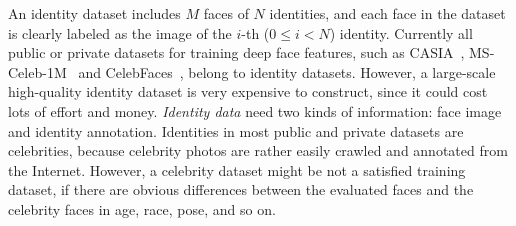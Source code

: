\documentclass[conference]{acmsiggraph}
\begin{document}
An identity dataset includes $M$ faces of $N$ identities, and each face in the dataset is clearly labeled as the image of the $i$-th ($0 \leq i < N$) identity. Currently all public or private datasets for training deep face features, such as CASIA~\cite{casia}, MS-Celeb-1M~\cite{msceleb} and CelebFaces~\cite{deepid2}, belong to identity datasets. However, a large-scale high-quality identity dataset is very expensive to construct, since it could cost lots of effort and money. \emph{Identity data} need two kinds of information: face image and identity annotation. Identities in most public and private datasets are celebrities, because celebrity photos are rather easily crawled and annotated from the Internet. However, a celebrity dataset might be not a satisfied training dataset, if there are obvious differences between the evaluated faces and the celebrity faces in age, race, pose, and so on.
\end{document}
